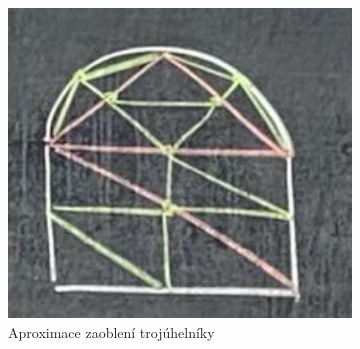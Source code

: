 \documentclass[../main.tex]{subfiles}
\begin{document}
\begin{figure}[h]
\begin{subfigure}[t]{0.49\textwidth}
        \includegraphics[width=1\textwidth]{images/aproximacezaoblenitrojuhelnikem.png}
        \caption{Aproximace zaoblení trojúhelníky}
        \label{obrazekaproximacezaoblenitrojuhelnikem}
    \end{subfigure}
    \caption{}
\end{figure}
\end{document}
